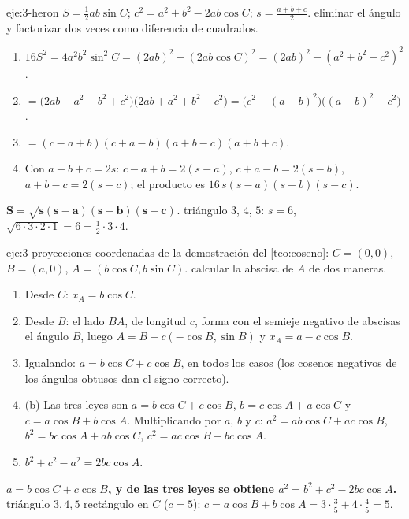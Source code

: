 \begin{solucion}{eje:3-heron}
\datos $S=\frac12ab\sin C$; $c^{2}=a^{2}+b^{2}-2ab\cos C$; $s=\frac{a+b+c}{2}$.
\planteamiento eliminar el ángulo y factorizar dos veces como diferencia de cuadrados.
\pasos
\begin{enumerate}[label=\arabic*.]
  \item $16S^{2}=4a^{2}b^{2}\sin^{2}C=(2ab)^{2}-(2ab\cos C)^{2}=(2ab)^{2}-(a^{2}+b^{2}-c^{2})^{2}$.
  \item $=\bigl(2ab-a^{2}-b^{2}+c^{2}\bigr)\bigl(2ab+a^{2}+b^{2}-c^{2}\bigr)=\bigl(c^{2}-(a-b)^{2}\bigr)\bigl((a+b)^{2}-c^{2}\bigr)$.
  \item $=(c-a+b)(c+a-b)(a+b-c)(a+b+c)$.
  \item Con $a+b+c=2s$: $c-a+b=2(s-a)$, $c+a-b=2(s-b)$, $a+b-c=2(s-c)$; el producto es $16\,s(s-a)(s-b)(s-c)$.
\end{enumerate}
\resultado $\mathbf{S=\sqrt{s(s-a)(s-b)(s-c)}}$.
\comprobacion triángulo $3$, $4$, $5$: $s=6$, $\sqrt{6\cdot3\cdot2\cdot1}=6=\frac12\cdot3\cdot4$.
\end{solucion}

\begin{solucion}{eje:3-proyecciones}
\datos coordenadas de la demostración del \cref{teo:coseno}: $C=(0,0)$, $B=(a,0)$, $A=(b\cos C,b\sin C)$.
\planteamiento calcular la abscisa de $A$ de dos maneras.
\pasos
\begin{enumerate}[label=\arabic*.]
  \item Desde $C$: $x_A=b\cos C$.
  \item Desde $B$: el lado $BA$, de longitud $c$, forma con el semieje negativo de abscisas el ángulo $B$, luego $A=B+c(-\cos B,\sin B)$ y $x_A=a-c\cos B$.
  \item Igualando: $a=b\cos C+c\cos B$, en todos los casos (los cosenos negativos de los ángulos obtusos dan el signo correcto).
  \item (b) Las tres leyes son $a=b\cos C+c\cos B$, $b=c\cos A+a\cos C$ y $c=a\cos B+b\cos A$. Multiplicando por $a$, $b$ y $c$: $a^{2}=ab\cos C+ac\cos B$, $b^{2}=bc\cos A+ab\cos C$, $c^{2}=ac\cos B+bc\cos A$.
  \item $b^{2}+c^{2}-a^{2}=2bc\cos A$.
\end{enumerate}
\resultado \textbf{$a=b\cos C+c\cos B$, y de las tres leyes se obtiene $a^{2}=b^{2}+c^{2}-2bc\cos A$.}
\comprobacion triángulo $3,4,5$ rectángulo en $C$ ($c=5$): $c=a\cos B+b\cos A=3\cdot\frac35+4\cdot\frac45=5$.
\end{solucion}

